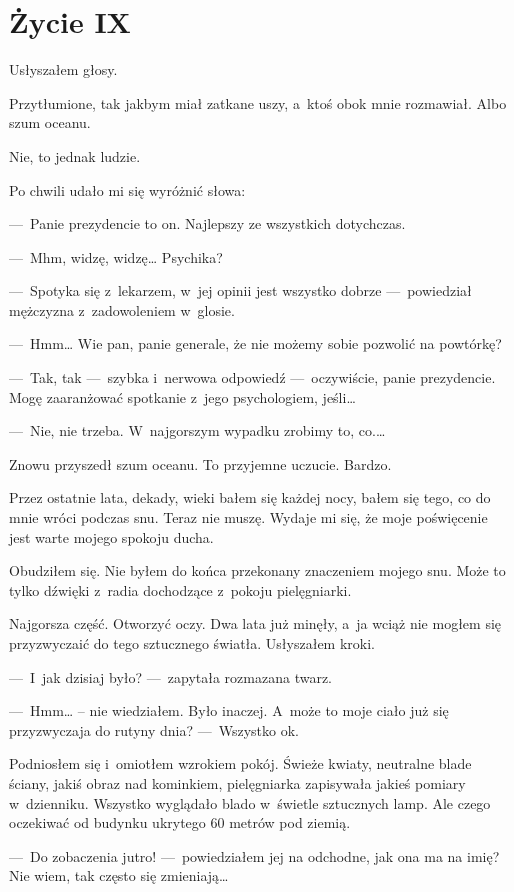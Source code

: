 \chapter{Życie IX}

Usłyszałem głosy. 

Przytłumione, tak jakbym miał zatkane uszy, a~ktoś obok mnie rozmawiał. Albo szum oceanu. 

Nie, to jednak ludzie. 

Po chwili udało mi się wyróżnić słowa:

---~Panie prezydencie to on. Najlepszy ze wszystkich dotychczas.

---~Mhm, widzę, widzę… Psychika?

---~Spotyka się z~lekarzem, w~jej opinii jest wszystko dobrze ---~powiedział mężczyzna z~zadowoleniem w~glosie.

---~Hmm… Wie pan, panie generale, że nie możemy sobie pozwolić na powtórkę?

---~Tak, tak ---~szybka i~nerwowa odpowiedź ---~oczywiście, panie prezydencie. Mogę zaaranżować spotkanie z~jego 
psychologiem, jeśli…

---~Nie, nie trzeba. W~najgorszym wypadku zrobimy to, co.…

Znowu przyszedł szum oceanu. To przyjemne uczucie. Bardzo.

Przez ostatnie lata, dekady, wieki bałem się każdej nocy, bałem się tego, co do mnie wróci podczas snu. Teraz nie 
muszę. Wydaje mi się, że moje poświęcenie jest warte mojego spokoju ducha.

Obudziłem się. Nie byłem do końca przekonany znaczeniem mojego snu. Może to tylko dźwięki z~radia dochodzące z~pokoju 
pielęgniarki.

Najgorsza część. Otworzyć oczy. Dwa lata już minęły, a~ja wciąż nie mogłem się przyzwyczaić do tego sztucznego 
światła. Usłyszałem kroki. 

---~I~jak dzisiaj było? ---~zapytała rozmazana twarz.

---~Hmm… – nie wiedziałem. Było inaczej. A~może to moje ciało już się przyzwyczaja do rutyny dnia? ---~Wszystko ok.

Podniosłem się i~omiotłem wzrokiem pokój. Świeże kwiaty, neutralne blade ściany, jakiś obraz nad kominkiem, 
pielęgniarka zapisywała jakieś pomiary w~dzienniku. Wszystko wyglądało blado w~świetle sztucznych lamp. 
Ale czego oczekiwać od budynku ukrytego 60 metrów pod ziemią.

---~Do zobaczenia jutro! ---~powiedziałem jej na odchodne, jak ona ma na imię? Nie wiem, tak często się zmieniają…

